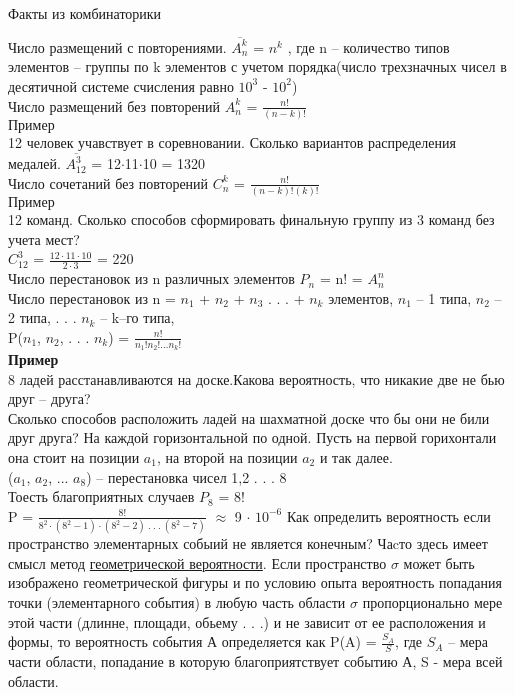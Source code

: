 \documentclass[russian, 12pt]{article}
\begin{document}
\newpage
\begin{center}
$\textbf{Факты из комбинаторики}$
\end{center}
Число размещений с повторениями. $\overline{A^k_n}$ = $n^k$ , 
где n -- количество типов элементов -- группы по k элементов с учетом порядка(число трехзначных чисел в десятичной системе счисления равно $10^3$ - $10^2$)\\
Число размещений без повторений $A^k_n$ = $\frac{n!}{(n-k)!}$\\
$\textbf{Пример}$ \\12 человек учавствует в соревновании. Сколько вариантов распределения медалей. $\overline{A^3_{12}}$  = 12$\cdot$11$\cdot$10  = 1320\\
Число сочетаний без повторений  $C^k_n$ = $\frac{n!}{(n-k)!(k)!}$\\
$\textbf{Пример}$ \\12 команд. Сколько способов сформировать финальную группу из 3 команд без учета мест?\\
  $C^3_{12}$  = $\frac{ 12\cdot11\cdot 10 }{2\cdot3} $ = 220\\
Число  перестановок из n различных элементов $P_n$ = n! = ${A^n_n}$\\
Число перестановок из n = $n_1$ + $n_2$ +  $n_3$ . . .  + $n_k$ элементов, $n_1$ -- 1 типа, $n_2$ -- 2 типа, . . . $n_k$ -- k--го типа,\\
P($n_1$,  $n_2$, . . .  $n_k$) = $\frac{n!}{{n_1}!{n_2}!. . .{n_k}!}$\\
\textbf{Пример}\\ 8 ладей расстанавливаются на доске.Какова вероятность, что никакие две не бью друг -- друга?\\
Сколько способов расположить ладей на шахматной доске что бы они не били друг друга? На каждой горизонтальной по одной. Пусть  на первой горихонтали она стоит на позиции $a_1$,  на второй на позиции $a_2$ и так далее.\\
($a_1$, $a_2$, ... $a_8$)  -- перестановка чисел 1,2 . . . 8\\
Тоесть благоприятных случаев $P_8$ = 8!\\
P = $\frac{8!}{ 8^2 \cdot (8^2 - 1) \cdot (8^2 - 2)  \ .\ .\ . \   (8^2 - 7)} $  $\approx$   9 $\cdot$  $10^{-6}$
Как определить вероятность если пространство элементарных собыий не является конечным? Чаcто здесь имеет смысл метод \underline{ геометрической вероятности}. Если пространство  $\sigma$ может быть изображено геометрической фигуры и по условию опыта вероятность попадания точки (элементарного события) в любую часть области $\sigma$ пропорционально мере этой части (длинне, площади, обьему . . .) и не зависит от ее расположения и формы, то вероятность события А определяется как P(A) = $\frac{S_A}{S}$, где $S_A$ -- мера части области, попадание в которую благоприятствует событию А, S - мера всей области.\\
\end{document}
